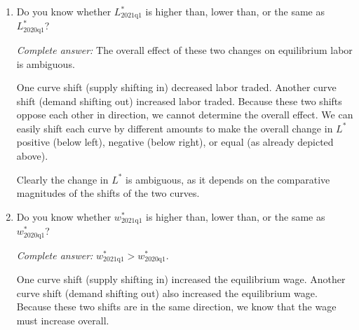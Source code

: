 \documentclass{assignment}
\begin{document}
\begin{enumerate}
\item Do you know whether $L^*_\text{2021q1}$ is higher than, lower than, or the same as $L^*_\text{2020q1}$?

\begin{solution}
\emph{Complete answer:} The overall effect of these two changes on equilibrium labor is ambiguous.

One curve shift (supply shifting in) decreased labor traded. Another curve shift (demand shifting out) increased labor traded. Because these two shifts oppose each other in direction, we cannot determine the overall effect. We can easily shift each curve by different amounts to make the overall change in $L^*$ positive (below left), negative (below right), or equal (as already depicted above).

\begin{center}
\vspace{-12pt}
\end{center}

Clearly the change in $L^*$ is ambiguous, as it depends on the comparative magnitudes of the shifts of the two curves.
\end{solution}

\item Do you know whether $w^*_\text{2021q1}$ is higher than, lower than, or the same as $w^*_\text{2020q1}$?

\begin{solution}
\emph{Complete answer:} $w^*_\text{2021q1} > w^*_\text{2020q1}$.

One curve shift (supply shifting in) increased the equilibrium wage. Another curve shift (demand shifting out) also increased the equilibrium wage. Because these two shifts are in the same direction, we know that the wage must increase overall.
\end{solution}

\end{enumerate}
\end{document}
